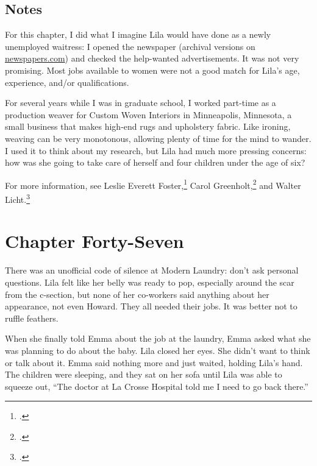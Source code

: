 \documentclass[
  american,
  letterpaper,
]{book}
\newcounter{none} %
\begin{document}
\section{Notes}\label{notes-48}

For this chapter, I did what I imagine Lila would have done as a newly
unemployed waitress: I opened the newspaper (archival versions on
\href{https://www.newspapers.com/}{newspapers.com}) and checked the
help-wanted advertisements. It was not very promising. Most jobs
available to women were not a good match for Lila's age, experience,
and/or qualifications.

For several years while I was in graduate school, I worked part-time as
a production weaver for Custom Woven Interiors in Minneapolis,
Minnesota, a small business that makes high-end rugs and upholstery
fabric. Like ironing, weaving can be very monotonous, allowing plenty of
time for the mind to wander. I used it to think about my research, but
Lila had much more pressing concerns: how was she going to take care of
herself and four children under the age of six?

For more information, see Leslie Everett Foster,\footnote{.} Carol
Greenholt,\footnote{.} and Walter
Licht.\footnote{.}


\chapter{Chapter Forty-Seven}\label{chapter-forty-seven}

There was an unofficial code of silence at Modern Laundry: don't ask
personal questions. Lila felt like her belly was ready to pop,
especially around the scar from the c-section, but none of her
co-workers said anything about her appearance, not even Howard. They all
needed their jobs. It was better not to ruffle feathers.

When she finally told Emma about the job at the laundry, Emma asked what
she was planning to do about the baby. Lila closed her eyes. She didn't
want to think or talk about it. Emma said nothing more and just waited,
holding Lila's hand. The children were sleeping, and they sat on her
sofa until Lila was able to squeeze out, ``The doctor at La Crosse
Hospital told me I need to go back there.''
\end{document}
